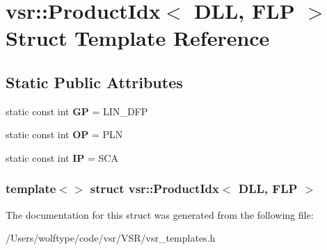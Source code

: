 \hypertarget{structvsr_1_1_product_idx_3_01_d_l_l_00_01_f_l_p_01_4}{\section{vsr\-:\-:Product\-Idx$<$ D\-L\-L, F\-L\-P $>$ Struct Template Reference}
\label{structvsr_1_1_product_idx_3_01_d_l_l_00_01_f_l_p_01_4}
}
\subsection*{Static Public Attributes}
\begin{DoxyCompactItemize}
\item 
\hypertarget{structvsr_1_1_product_idx_3_01_d_l_l_00_01_f_l_p_01_4_ab4e2b2227b289f45662c20dd1bd7659c}{static const int {\bfseries G\-P} = L\-I\-N\-\_\-\-D\-F\-P}\label{structvsr_1_1_product_idx_3_01_d_l_l_00_01_f_l_p_01_4_ab4e2b2227b289f45662c20dd1bd7659c}

\item 
\hypertarget{structvsr_1_1_product_idx_3_01_d_l_l_00_01_f_l_p_01_4_a07e63ddc92b6f4bfb903112c0bb34c6f}{static const int {\bfseries O\-P} = P\-L\-N}\label{structvsr_1_1_product_idx_3_01_d_l_l_00_01_f_l_p_01_4_a07e63ddc92b6f4bfb903112c0bb34c6f}

\item 
\hypertarget{structvsr_1_1_product_idx_3_01_d_l_l_00_01_f_l_p_01_4_aa94256bc521753e53a1e734d898b76a2}{static const int {\bfseries I\-P} = S\-C\-A}\label{structvsr_1_1_product_idx_3_01_d_l_l_00_01_f_l_p_01_4_aa94256bc521753e53a1e734d898b76a2}

\end{DoxyCompactItemize}
\subsubsection*{template$<$$>$ struct vsr\-::\-Product\-Idx$<$ D\-L\-L, F\-L\-P $>$}



The documentation for this struct was generated from the following file\-:\begin{DoxyCompactItemize}
\item 
/\-Users/wolftype/code/vsr/\-V\-S\-R/vsr\-\_\-templates.\-h\end{DoxyCompactItemize}
